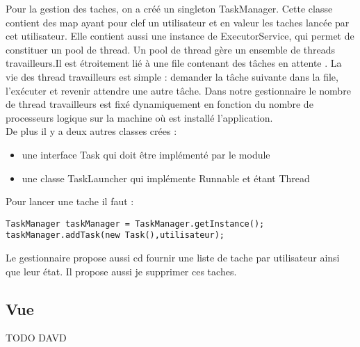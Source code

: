 Pour la gestion des taches, on a créé un singleton TaskManager. Cette classe contient des map ayant pour clef un utilisateur et en valeur les taches lancée par cet utilisateur. Elle contient aussi une instance de ExecutorService, qui permet de constituer un pool de thread. Un pool de thread gère un ensemble de threads travailleurs.Il est étroitement lié à une file contenant des tâches en attente . La vie des thread travailleurs est simple : demander la tâche suivante dans la file, l'exécuter et revenir attendre une autre tâche. Dans notre gestionnaire le nombre de thread travailleurs est fixé dynamiquement en fonction du nombre de processeurs logique sur la machine où est installé l'application.\\
De plus il y a deux autres classes crées : \\
\begin{itemize}
\item une interface Task qui doit être implémenté par le module
\item une classe TaskLauncher qui implémente Runnable et étant Thread
\end{itemize}
Pour lancer une tache il faut :
\begin{verbatim}
TaskManager taskManager = TaskManager.getInstance();
taskManager.addTask(new Task(),utilisateur);
\end{verbatim}
Le gestionnaire propose aussi cd fournir une liste de tache par utilisateur ainsi que leur état. Il propose aussi je supprimer ces taches.\\

\subsection{Vue}
TODO DAVD